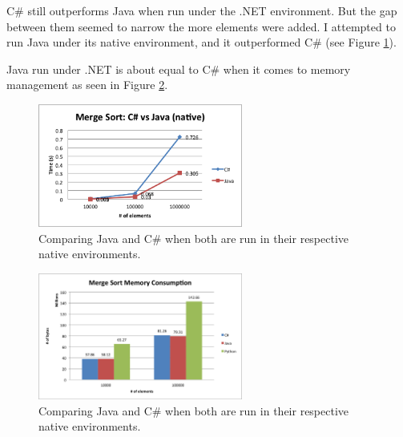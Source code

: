 C\# still outperforms Java when run under the .NET environment. But the gap between them seemed to narrow the more elements were added. I attempted to run Java under its native environment, and it  outperformed C\# (see Figure \ref{fig:merge_sort_csharp_java_native}). 

Java run under .NET is about equal to C\# when it comes to memory management as seen in Figure \ref{fig:merge_sort_memory}. 

\begin{figure}[h]
	\centering
	\includegraphics[width=0.6\textwidth]{chapters/media/merge_sort_csharp_java_native.png}
	\caption{Comparing Java and C\# when both are run in their respective native environments.}
	\label{fig:merge_sort_csharp_java_native}
\end{figure}

\begin{figure}[h]
	\centering
	\includegraphics[width=0.6\textwidth]{chapters/media/merge_sort_memory.png}
	\caption{Comparing Java and C\# when both are run in their respective native environments.}
	\label{fig:merge_sort_memory}
\end{figure}